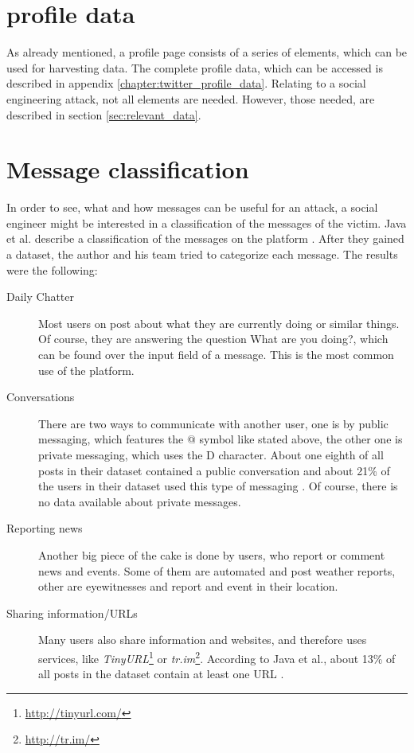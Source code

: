 \section{\Twitter{} profile data}
\label{sec:twitter_profile_data}

As already mentioned, a \Twitter{} profile page consists of a series of
elements, which can be used for harvesting data. The complete profile data,
which can be accessed is described in appendix
\ref{chapter:twitter_profile_data}. Relating to a social engineering attack,
not all elements are needed. However, those needed, are described in section
\ref{sec:relevant_data}.

\section{Message classification}

In order to see, what and how messages can be useful for an attack, a social
engineer might be interested in a classification of the messages of the victim.
Java et al. describe a classification of the messages on the \Twitter{}
platform \cite{java2007}. After they gained a dataset, the author and his team
tried to categorize each message. The results were the following:

\begin{description}

\item[Daily Chatter]
Most users on \Twitter{} post about what they are currently doing or similar
things. Of course, they are answering the question \flqq{}What are you
doing?\frqq{}, which can be found over the input field of a message. This is
the most common use of the \Twitter{} platform.

\item[Conversations]
There are two ways to communicate with another user, one is by public
messaging, which features the @ symbol like stated above, the other one is
private messaging, which uses the D character. About one eighth of all posts
in their dataset contained a public conversation and about 21\% of the users in
their dataset used this type of messaging \cite{java2007}. Of course, there is
no data available about private messages.

\item[Reporting news]
Another big piece of the cake is done by users, who report or comment news and
events. Some of them are automated and post weather reports, other are
eyewitnesses and report and event in their location.

\item[Sharing information/URLs]
Many users also share information and websites, and therefore uses services,
like \textit{TinyURL}\footnote{\url{http://tinyurl.com/}} or
\textit{tr.im}\footnote{\url{http://tr.im/}}. According to Java et al.,
about 13\% of all posts in the dataset contain at least one URL \cite{java2007}.

\end{description}


